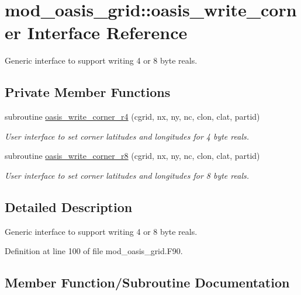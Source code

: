 \hypertarget{interfacemod__oasis__grid_1_1oasis__write__corner}{}\section{mod\+\_\+oasis\+\_\+grid\+:\+:oasis\+\_\+write\+\_\+corner Interface Reference}
\label{interfacemod__oasis__grid_1_1oasis__write__corner}


Generic interface to support writing 4 or 8 byte reals.  


\subsection*{Private Member Functions}
\begin{DoxyCompactItemize}
\item 
subroutine \hyperlink{interfacemod__oasis__grid_1_1oasis__write__corner_acb0520c68b0c2c954efc30818d2fc35e}{oasis\+\_\+write\+\_\+corner\+\_\+r4} (cgrid, nx, ny, nc, clon, clat, partid)
\begin{DoxyCompactList}\small\item\em User interface to set corner latitudes and longitudes for 4 byte reals. \end{DoxyCompactList}\item 
subroutine \hyperlink{interfacemod__oasis__grid_1_1oasis__write__corner_a441287a06e48050d2891f65497b756a0}{oasis\+\_\+write\+\_\+corner\+\_\+r8} (cgrid, nx, ny, nc, clon, clat, partid)
\begin{DoxyCompactList}\small\item\em User interface to set corner latitudes and longitudes for 8 byte reals. \end{DoxyCompactList}\end{DoxyCompactItemize}


\subsection{Detailed Description}
Generic interface to support writing 4 or 8 byte reals. 

Definition at line 100 of file mod\+\_\+oasis\+\_\+grid.\+F90.



\subsection{Member Function/\+Subroutine Documentation}
\mbox{\label{interfacemod__oasis__grid_1_1oasis__write__corner_acb0520c68b0c2c954efc30818d2fc35e}} 
